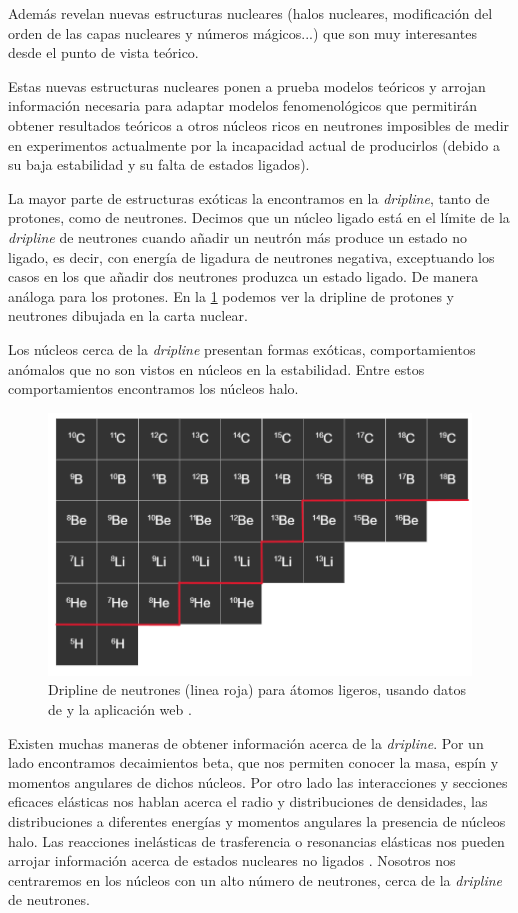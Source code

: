 Además revelan nuevas estructuras nucleares (halos nucleares, modificación del orden de las capas nucleares y números mágicos...) que son muy interesantes desde el punto de vista teórico. 

Estas nuevas estructuras nucleares ponen a prueba modelos teóricos y arrojan información necesaria para adaptar modelos fenomenológicos que permitirán obtener resultados teóricos a otros núcleos ricos en neutrones imposibles de medir en experimentos actualmente por la incapacidad actual de producirlos (debido a su baja estabilidad y su falta de estados ligados). 

La mayor parte de estructuras exóticas la encontramos en la \textit{dripline}, tanto de protones, como de neutrones. Decimos que un núcleo ligado está en el límite de la \textit{dripline} de neutrones cuando añadir un neutrón más produce un estado no ligado, es decir, con energía de ligadura de neutrones negativa, exceptuando los casos en los que añadir dos neutrones produzca un estado ligado. De manera análoga para los protones. En la \cref{fig:02-dripline} podemos ver la dripline de protones y neutrones dibujada en la carta nuclear. 


Los núcleos cerca de la \textit{dripline} presentan formas exóticas, comportamientos anómalos que no son vistos en núcleos en la estabilidad. Entre estos comportamientos encontramos los núcleos halo. 

\begin{figure}[H]
    \centering
    \includegraphics[width=0.5\linewidth]{Imagenes/NuclearChart.png}
    \caption{Dripline de neutrones (linea roja) para átomos ligeros, usando datos de \cite{Huang_2021} y la aplicación web \cite{nuclear_chart_colorful}.}
    \label{fig:02-dripline}
\end{figure}



Existen muchas maneras de obtener información acerca de la \textit{dripline}. Por un lado encontramos decaimientos beta, que nos permiten conocer la masa, espín y momentos angulares de dichos núcleos. Por otro lado las interacciones y secciones eficaces elásticas nos hablan acerca el radio y distribuciones de densidades, las distribuciones a diferentes energías y momentos angulares la presencia de núcleos halo. Las reacciones inelásticas de trasferencia o resonancias elásticas nos pueden arrojar información acerca de estados nucleares no ligados \cite{JONSON20041}. Nosotros nos centraremos en los núcleos con un alto número de neutrones, cerca de la \textit{dripline} de neutrones.

